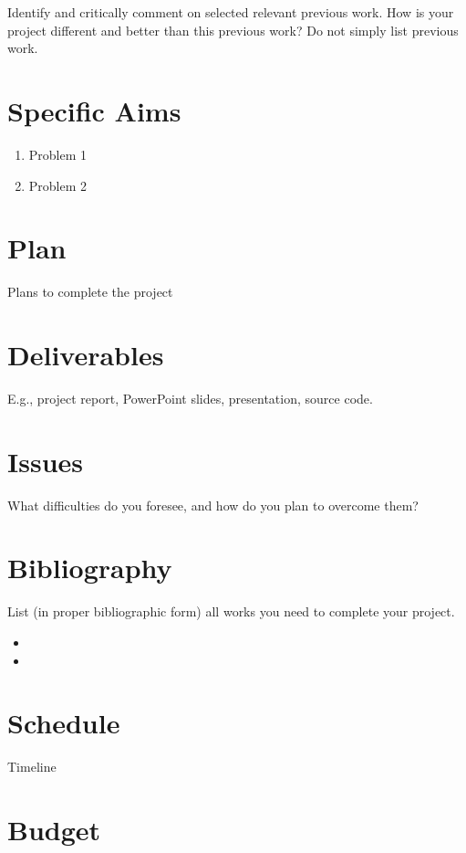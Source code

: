 \documentclass[a4paper,11pt]{article}
\begin{document}
Identify and critically comment on selected relevant previous work. How is your project different and
better than this previous work? Do not simply list previous work.


\section{Specific Aims}

\begin{enumerate}
\item Problem 1
\item Problem 2

\end{enumerate}


\section{Plan}
Plans to complete the project 

\section{Deliverables}

E.g., project report, PowerPoint slides, presentation, source code.


\section{Issues}
What difficulties do you foresee, and how do you plan to overcome them?

\section{Bibliography}
List (in proper bibliographic form) all works you need to complete your project.


\begin{itemize}
\item
\item
\end{itemize}  

\section{Schedule}

Timeline

\section{Budget}
\end{document}
